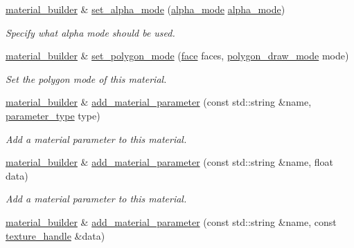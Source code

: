 \begin{DoxyCompactItemize}
\mbox{\hyperlink{classmoka_1_1material__builder}{material\+\_\+builder}} \& \mbox{\hyperlink{classmoka_1_1material__builder_a7cf5ec782ed06d8b1b74788400ad55d1}{set\+\_\+alpha\+\_\+mode}} (\mbox{\hyperlink{namespacemoka_ad3e7f1428e786c2e7780186b8c0b0d81}{alpha\+\_\+mode}} \mbox{\hyperlink{namespacemoka_ad3e7f1428e786c2e7780186b8c0b0d81}{alpha\+\_\+mode}})
\begin{DoxyCompactList}\small\item\em Specify what alpha mode should be used. \end{DoxyCompactList}\item 
\mbox{\hyperlink{classmoka_1_1material__builder}{material\+\_\+builder}} \& \mbox{\hyperlink{classmoka_1_1material__builder_a19080392d3e2aca73feb566ff088a956}{set\+\_\+polygon\+\_\+mode}} (\mbox{\hyperlink{namespacemoka_a262acd665924ba4041f64f7207b17cbe}{face}} faces, \mbox{\hyperlink{namespacemoka_ab11ab0363880d78783c5e5b4d5c28a8b}{polygon\+\_\+draw\+\_\+mode}} mode)
\begin{DoxyCompactList}\small\item\em Set the polygon mode of this material. \end{DoxyCompactList}\item 
\mbox{\hyperlink{classmoka_1_1material__builder}{material\+\_\+builder}} \& \mbox{\hyperlink{classmoka_1_1material__builder_af094ca99e624797eacc7e514a791e80b}{add\+\_\+material\+\_\+parameter}} (const std\+::string \&name, \mbox{\hyperlink{namespacemoka_aed2224bc0e5b79e57a8975ded94ee1aa}{parameter\+\_\+type}} type)
\begin{DoxyCompactList}\small\item\em Add a material parameter to this material. \end{DoxyCompactList}\item 
\mbox{\hyperlink{classmoka_1_1material__builder}{material\+\_\+builder}} \& \mbox{\hyperlink{classmoka_1_1material__builder_af47cff3e8716c77c38f4db89afaa91b6}{add\+\_\+material\+\_\+parameter}} (const std\+::string \&name, float data)
\begin{DoxyCompactList}\small\item\em Add a material parameter to this material. \end{DoxyCompactList}\item 
\mbox{\hyperlink{classmoka_1_1material__builder}{material\+\_\+builder}} \& \mbox{\hyperlink{classmoka_1_1material__builder_a3f5539f47e509777bfd5f552120aa223}{add\+\_\+material\+\_\+parameter}} (const std\+::string \&name, const \mbox{\hyperlink{structmoka_1_1texture__handle}{texture\+\_\+handle}} \&data)

\end{DoxyCompactItemize}
